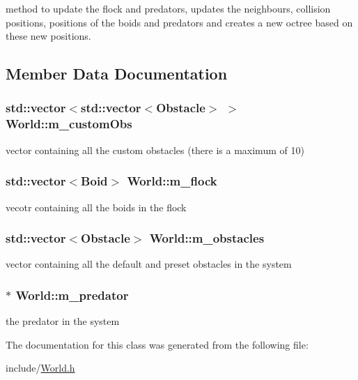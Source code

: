 method to update the flock and predators, updates the neighbours, collision positions, positions of the boids and predators and creates a new octree based on these new positions. 

\subsection{Member Data Documentation}
\hypertarget{classWorld_ab22ebe01284816caec0162158e5ddfdb}{
\subsubsection[{m\_\-customObs}]{\setlength{\rightskip}{0pt plus 5cm}std::vector$<$std::vector$<${\bf Obstacle}$>$ $>$ {\bf World::m\_\-customObs}}}
\label{classWorld_ab22ebe01284816caec0162158e5ddfdb}


vector containing all the custom obstacles (there is a maximum of 10) \hypertarget{classWorld_ad2a6ae0d79431a2585aabf1f0d76cea1}{
\subsubsection[{m\_\-flock}]{\setlength{\rightskip}{0pt plus 5cm}std::vector$<${\bf Boid}$>$ {\bf World::m\_\-flock}}}
\label{classWorld_ad2a6ae0d79431a2585aabf1f0d76cea1}


vecotr containing all the boids in the flock \hypertarget{classWorld_aaf8500551c6ba9775986708130e24ec6}{
\subsubsection[{m\_\-obstacles}]{\setlength{\rightskip}{0pt plus 5cm}std::vector$<${\bf Obstacle}$>$ {\bf World::m\_\-obstacles}}}
\label{classWorld_aaf8500551c6ba9775986708130e24ec6}


vector containing all the default and preset obstacles in the system \hypertarget{classWorld_aa117082f4805bdfe15b35a1b36df35e5}{
\subsubsection[{m\_\-predator}]{$\ast$ {\bf World::m\_\-predator}}}
\label{classWorld_aa117082f4805bdfe15b35a1b36df35e5}


the predator in the system 

The documentation for this class was generated from the following file:\begin{DoxyCompactItemize}
\item 
include/\hyperlink{World_8h}{World.h}\end{DoxyCompactItemize}
